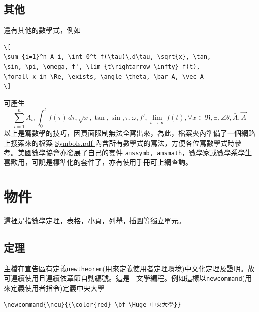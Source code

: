 \subsection{其他}
還有其他的數學式，例如
\begin{Verbatim}[frame=single,firstline=1,label=Various math forms]
\[
\sum_{i=1}^n A_i, \int_0^t f(\tau)\,d\tau, \sqrt{x}, \tan, 
\sin, \pi, \omega, f', \lim_{t\rightarrow \infty} f(t),
\forall x in \Re, \exists, \angle \theta, \bar A, \vec A
\]
\end{Verbatim}
可產生   
\[
\sum_{i=1}^n A_i,  \int_0^t f(\tau)\,d\tau, \sqrt{x}, \tan, \sin, \pi, \omega, f',
\lim_{t\rightarrow \infty} f(t),
\forall x \in \Re, \exists, \angle \theta, \bar A, \vec A
\]
以上是寫數學的技巧，因頁面限制無法全寫出來，為此，檔案夾內準備了一個網路上搜索來的檔案
\href{./Symbols.pdf}{ Symbols.pdf }內含所有數學式的寫法，方便各位寫數學式時參考。美國數學協會亦發展了自己的套件
{\tt amssymb, amsmath}，數學家或數學系學生喜歡用，可說是標準化的套件了，亦有使用手冊可上網查詢。
\section{物件}
這裡是指數學定理，表格，小頁，列舉，插圖等獨立單元。

\subsection{定理}
主檔在宣告區有定義{\tt newtheorem}(用來定義使用者定理環境)中文化定理及證明。故可連續使用且連續依章節自動編號。這是 ---文學編程。例如這樣以{\tt newcommand}(用來定義使用者指令)定義中央大學

\begin{Verbatim}[frame=single,firstline=1,label=Simple macro without parameters]
\newcommand{\ncu}{{\color{red} \bf \Huge 中央大學}}
\end{Verbatim}

